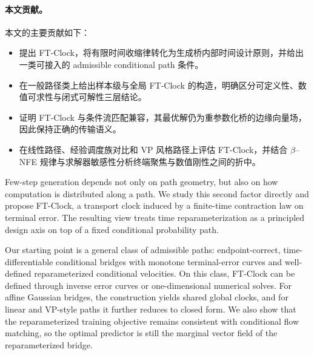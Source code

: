 \paragraph{本文贡献。}
本文的主要贡献如下：
\begin{itemize}[leftmargin=1.5em]
  \item 提出 FT-Clock，将有限时间收缩律转化为生成桥内部时间设计原则，并给出一类可接入的 admissible conditional path 条件。
  \item 在一般路径类上给出样本级与全局 FT-Clock 的构造，明确区分可定义性、数值可求性与闭式可解性三层结论。
  \item 证明 FT-Clock 与条件流匹配兼容，其最优解仍为重参数化桥的边缘向量场，因此保持正确的传输语义。
  \item 在线性路径、经验调度族对比和 VP 风格路径上评估 FT-Clock，并结合 $\beta$--NFE 规律与求解器敏感性分析终端聚焦与数值刚性之间的折中。
\end{itemize}
\else
Few-step generation depends not only on path geometry, but also on how computation is distributed along a path. We study this second factor directly and propose FT-Clock, a transport clock induced by a finite-time contraction law on terminal error. The resulting view treats time reparameterization as a principled design axis on top of a fixed conditional probability path.

Our starting point is a general class of admissible paths: endpoint-correct, time-differentiable conditional bridges with monotone terminal-error curves and well-defined reparameterized conditional velocities. On this class, FT-Clock can be defined through inverse error curves or one-dimensional numerical solves. For affine Gaussian bridges, the construction yields shared global clocks, and for linear and VP-style paths it further reduces to closed form. We also show that the reparameterized training objective remains consistent with conditional flow matching, so the optimal predictor is still the marginal vector field of the reparameterized bridge.
\fi
